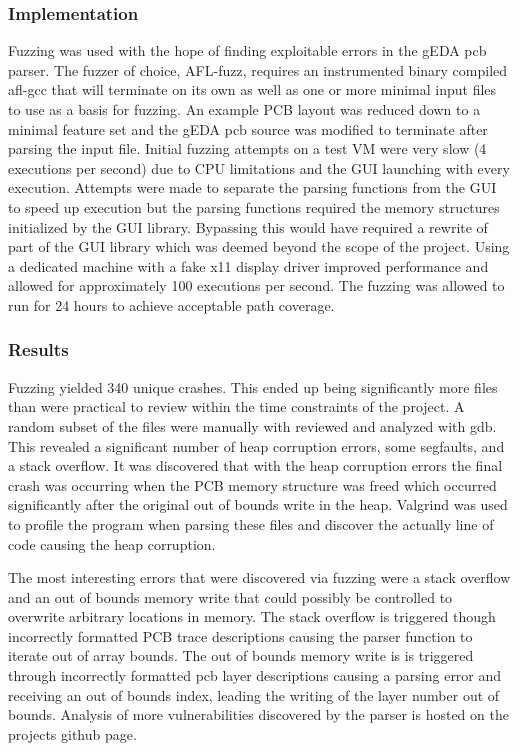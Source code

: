 \documentclass[12pt]{article}
\begin{document}
\subsubsection{Implementation} 
Fuzzing was used with the hope of finding exploitable errors in the gEDA pcb parser. The fuzzer of choice, AFL-fuzz, requires an instrumented binary compiled afl-gcc that will terminate on its own as well as one or more minimal input files to use as a basis for fuzzing. An example PCB layout was reduced down to a minimal feature set and the gEDA pcb source was modified to terminate after parsing the input file. Initial fuzzing attempts on a test VM were very slow (4 executions per second) due to CPU limitations and the GUI launching with every execution. Attempts were made to separate the parsing functions from the GUI to speed up execution but the parsing functions required the memory structures initialized by the GUI library. Bypassing this would have required a rewrite of part of the GUI library which was deemed beyond the scope of the project. Using a dedicated machine with a fake x11 display driver improved performance and allowed for approximately 100 executions per second. The fuzzing was allowed to run for 24 hours to achieve acceptable path coverage. 

\subsubsection{Results}
Fuzzing yielded 340 unique crashes. This ended up being significantly more files than were practical to review within the time constraints of the project. A random subset of the files were manually with reviewed and analyzed with gdb. This revealed a significant number of heap corruption errors, some segfaults, and a stack overflow. It was discovered that with the heap corruption errors the final crash was occurring when the PCB memory structure was freed which occurred significantly after the original out of bounds write in the heap. Valgrind was used to profile the program when parsing these files and discover the actually line of code causing the heap corruption.


The most interesting errors that were discovered via fuzzing were a stack overflow and an out of bounds memory write that could possibly be controlled to overwrite arbitrary locations in memory. The stack overflow is triggered though incorrectly formatted PCB trace descriptions causing the parser function to iterate out of array bounds. The out of bounds memory write is is triggered through incorrectly formatted pcb layer descriptions causing a parsing error and receiving an out of bounds index, leading the writing of the layer number out of bounds. Analysis of more vulnerabilities discovered by the parser is hosted on the projects github page.  
\end{document}
